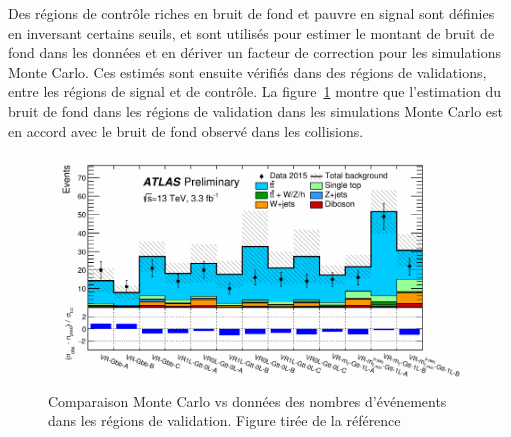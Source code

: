 
Des régions de contrôle riches en bruit de fond et pauvre en signal
sont définies en inversant certains seuils, et sont utilisés pour
estimer le montant de bruit de fond dans les données et en dériver un
facteur de correction pour les simulations Monte Carlo. Ces estimés sont ensuite
vérifiés dans des régions de validations, entre les régions de signal
et de contrôle. La figure~\ref{fig:pull} montre que l'estimation du
bruit de fond dans les régions de validation dans les simulations
Monte Carlo est en accord avec le bruit de fond observé dans les
collisions.

\begin{figure}
  \centering
  \includegraphics[width=.7\textwidth]{pull.pdf}
  \caption{Comparaison Monte Carlo vs données des nombres d'événements
    dans les régions de validation. Figure tirée de la
    référence~\cite{ATLAS-CONF-2015-067}}
\label{fig:pull}
\end{figure}

